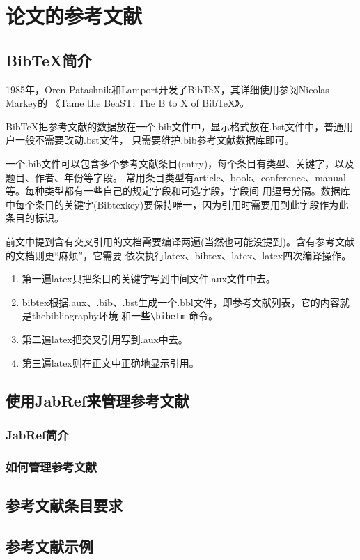 \chapter{论文的参考文献}
\section{BibTeX简介}
1985年，Oren Patashnik和Lamport开发了BibTeX，其详细使用参阅Nicolas Markey的
《Tame the BeaST: The B to X of BibTeX》。

BibTeX把参考文献的数据放在一个.bib文件中，显示格式放在.bst文件中，普通用户一般不需要改动.bst文件，
只需要维护.bib参考文献数据库即可。

一个.bib文件可以包含多个参考文献条目(entry)，每个条目有类型、关键字，以及题目、作者、年份等字段。
常用条目类型有article、book、conference、manual等。每种类型都有一些自己的规定字段和可选字段，字段间
用逗号分隔。数据库中每个条目的关键字(Bibtexkey)要保持唯一，因为引用时需要用到此字段作为此条目的标识。

前文中提到含有交叉引用的文档需要编译两遍(当然也可能没提到)。含有参考文献的文档则更“麻烦”，它需要
依次执行latex、bibtex、latex、latex四次编译操作。
\begin{enumerate}
\item 第一遍latex只把条目的关键字写到中间文件.aux文件中去。
\item bibtex根据.aux、.bib、.bst生成一个.bbl文件，即参考文献列表，它的内容就是thebibliography环境
和一些\verb|\bibetm| 命令。
\item 第二遍latex把交叉引用写到.aux中去。
\item 第三遍latex则在正文中正确地显示引用。
\end{enumerate}

\section{使用JabRef来管理参考文献}
\subsection{JabRef简介}
\subsection{如何管理参考文献}
\section{参考文献条目要求}
\section{参考文献示例}

